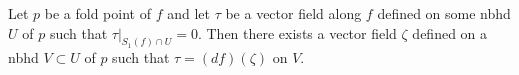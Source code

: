 Let $p$ be a fold point of $f$ and let $\tau$ be a vector field along $f$ defined on some nbhd $U$ of $p$ such that $\tau|_{S_1(f) \cap U} = 0$. Then there exists a vector field $\zeta$ defined on a nbhd $V \subset U$ of $p$ such that $\tau = (df)(\zeta)$ on $V$.
